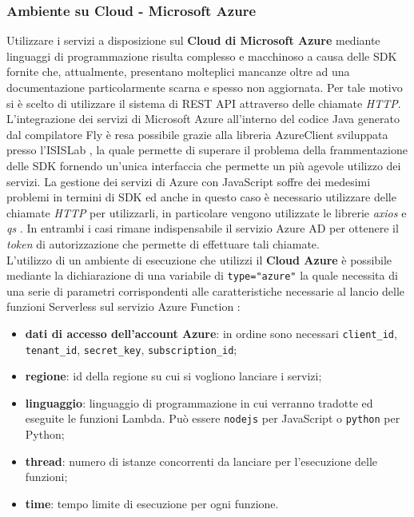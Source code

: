 \subsubsection{Ambiente su Cloud - Microsoft Azure}
Utilizzare i servizi a disposizione sul \textbf{Cloud di Microsoft Azure} mediante linguaggi di programmazione risulta complesso e macchinoso a causa delle SDK fornite che, attualmente, presentano molteplici mancanze oltre ad una documentazione particolarmente scarna e spesso non aggiornata. Per tale motivo si è scelto di utilizzare il sistema di REST API attraverso delle chiamate \textit{HTTP}. L'integrazione dei servizi di Microsoft Azure all'interno del codice Java generato dal compilatore Fly è resa possibile grazie alla libreria AzureClient sviluppata presso l'ISISLab \cite{Grieco}, la quale permette di superare il problema della frammentazione delle SDK fornendo un'unica interfaccia che permette un più agevole utilizzo dei servizi. La gestione dei servizi di Azure con JavaScript soffre dei medesimi problemi in termini di SDK ed anche in questo caso è necessario utilizzare delle chiamate \textit{HTTP} per utilizzarli, in particolare vengono utilizzate le librerie \textit{axios} \cite{axios} e \textit{qs} \cite{qs}. In entrambi i casi rimane indispensabile il servizio Azure AD \cite{azureAD} per ottenere il \textit{token} di autorizzazione che permette di effettuare tali chiamate.\\
L'utilizzo di un ambiente di esecuzione che utilizzi il \textbf{Cloud Azure} è possibile mediante la dichiarazione di una variabile di \verb|type|\verb|=|\verb|"azure"| la quale necessita di una serie di parametri corrispondenti alle caratteristiche necessarie al lancio delle funzioni Serverless sul servizio Azure Function \cite{azureFunction}:

\begin{itemize}
    \item \textbf{dati di accesso dell'account Azure}: in ordine sono necessari \verb|client_id|,  \verb|tenant_id|, \verb|secret_key|, \verb|subscription_id|;
    \item \textbf{regione}: id della regione su cui si vogliono lanciare i servizi;
    \item \textbf{linguaggio}: linguaggio di programmazione in cui verranno tradotte ed eseguite le funzioni Lambda. Può essere \verb|nodejs| per JavaScript o \verb|python| per Python;
    \item \textbf{thread}: numero di istanze concorrenti da lanciare per l'esecuzione delle funzioni;
    \item \textbf{time}: tempo limite di esecuzione per ogni funzione.
\end{itemize}



